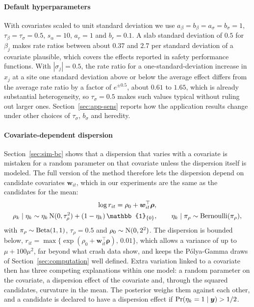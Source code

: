\paragraph{Default hyperparameters} With covariates scaled to unit standard deviation we use $a_\beta=b_\beta=a_\sigma=b_\sigma=1$, $\tau_\beta=\tau_\sigma=0.5$, $s_\alpha=10$, $a_r=1$ and $b_r=0.1$. A slab standard deviation of $0.5$ for $\beta_j$ makes rate ratios between about $0.37$ and $2.7$ per standard deviation of a covariate plausible, which covers the effects reported in safety performance functions. With $|\sigma_j|=0.5$, the rate ratio for a one-standard-deviation increase in $x_j$ at a site one standard deviation above or below the average effect differs from the average rate ratio by a factor of $e^{\pm0.5}$, about $0.61$ to $1.65$, which is already substantial heterogeneity, so $\tau_\sigma=0.5$ makes such values typical without ruling out larger ones. Section~\ref{sec:app-sens} reports how the application results change under other choices of $\tau_\sigma$, $b_\sigma$ and heredity.

\paragraph{Covariate-dependent dispersion} Section~\ref{sec:sim-bc} shows that a dispersion that varies with a covariate is mistaken for a random parameter on that covariate unless the dispersion itself is modeled. The full version of the method therefore lets the dispersion depend on candidate covariates $\bm w_{it}$, which in our experiments are the same as the candidates for the mean:
\begin{equation}\label{eq:dispersion}
\begin{gathered}
\log r_{it}=\rho_0+\bm w_{it}^\top\bm\rho,\\
\rho_k\mid\eta_k\sim\eta_k\,\Normal(0,\tau_\rho^2)+(1-\eta_k)\,\mathbb{1}_{\{0\}},\qquad
\eta_k\mid\pi_\rho\sim\Bern(\pi_\rho),
\end{gathered}
\end{equation}
with $\pi_\rho\sim\mathrm{Beta}(1,1)$, $\tau_\rho=0.5$ and $\rho_0\sim\mathrm{N}(0,2^2)$. The dispersion is bounded below, $r_{it}=\max\{\exp(\rho_0+\bm w_{it}^\top\bm\rho),\,0.01\}$, which allows a variance of up to $\mu+100\mu^2$, far beyond what crash data show, and keeps the P\'olya-Gamma draws of Section~\ref{sec:computation} well defined. Extra variation linked to a covariate then has three competing explanations within one model: a random parameter on the covariate, a dispersion effect of the covariate and, through the squared candidates, curvature in the mean. The posterior weighs them against each other, and a candidate is declared to have a dispersion effect if $\Pr(\eta_k=1\mid\bm{y})>1/2$.

